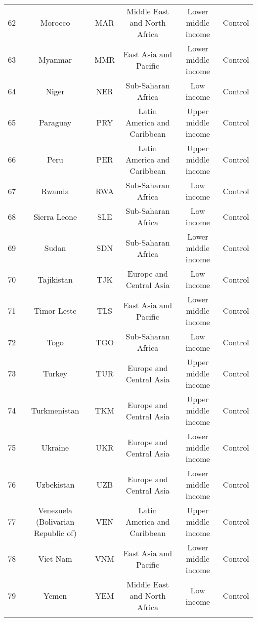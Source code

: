 \begin{table}[!htbp]
\begin{tabular}{@{\extracolsep{5pt}} cccccc}
62 & Morocco & MAR & Middle East and North Africa & Lower middle income & Control \\ 
63 & Myanmar & MMR & East Asia and Pacific & Lower middle income & Control \\ 
64 & Niger & NER & Sub-Saharan Africa & Low income & Control \\ 
65 & Paraguay & PRY & Latin America and Caribbean & Upper middle income & Control \\ 
66 & Peru & PER & Latin America and Caribbean & Upper middle income & Control \\ 
67 & Rwanda & RWA & Sub-Saharan Africa & Low income & Control \\ 
68 & Sierra Leone & SLE & Sub-Saharan Africa & Low income & Control \\ 
69 & Sudan & SDN & Sub-Saharan Africa & Lower middle income & Control \\ 
70 & Tajikistan & TJK & Europe and Central Asia & Low income & Control \\ 
71 & Timor-Leste & TLS & East Asia and Pacific & Lower middle income & Control \\ 
72 & Togo & TGO & Sub-Saharan Africa & Low income & Control \\ 
73 & Turkey & TUR & Europe and Central Asia & Upper middle income & Control \\ 
74 & Turkmenistan & TKM & Europe and Central Asia & Upper middle income & Control \\ 
75 & Ukraine & UKR & Europe and Central Asia & Lower middle income & Control \\ 
76 & Uzbekistan & UZB & Europe and Central Asia & Lower middle income & Control \\ 
77 & Venezuela (Bolivarian Republic of) & VEN & Latin America and Caribbean & Upper middle income & Control \\ 
78 & Viet Nam & VNM & East Asia and Pacific & Lower middle income & Control \\ 
79 & Yemen & YEM & Middle East and North Africa & Low income & Control \\ 
\hline \\[-1.8ex] 
\end{tabular} 
\end{table} 
